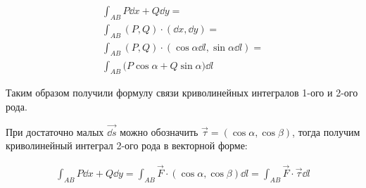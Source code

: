 
\begin{multicols}{2}
  \begin{align*}
    \int_{AB} P \dd x + Q \dd y = \\
    \int_{AB} (P, Q) \cdot (\dd x, \dd y) = \\
    \int_{AB} (P, Q) \cdot (\cos \alpha \dd l, \sin \alpha \dd l) = \\
    \int_{AB} \Big( P \cos \alpha + Q \sin \alpha \Big) \dd l
  \end{align*}
  \columnbreak

  
\end{multicols}

Таким образом получили формулу связи криволинейных интегралов 1-ого и 2-ого
рода.

\begin{remark}
  При достаточно малых \(\vec{\dd s}\) можно обозначить
  \(\vec{\tau} = (\cos \alpha, \cos \beta)\),
  тогда получим криволинейный интеграл 2-ого рода в векторной форме:

  \begin{align*}
    \int_{AB} P \dd x + Q \dd y
    = \int_{AB} \vec{F} \cdot (\cos \alpha, \cos \beta) \dd l
    = \int_{AB} \vec{F} \cdot \vec{\tau} \dd l
  \end{align*}
\end{remark}